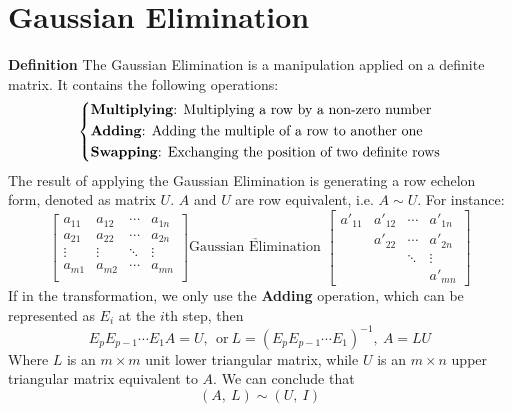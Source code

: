 \documentclass[11pt]{article}
\begin{document}
\section{Gaussian Elimination}
\noindent \textbf{Definition} The Gaussian Elimination is a manipulation applied on a definite matrix. It contains the following operations:
\begin{equation}
\left\{
\begin{aligned}
    &\text{\textbf{Multiplying}: Multiplying a row by a non-zero number} \\
    &\text{\textbf{Adding}: Adding the multiple of a row to another one} \\
    &\text{\textbf{Swapping}: Exchanging the position of two definite rows}\\
\end{aligned}
\right.
\end{equation}
The result of applying the Gaussian Elimination is generating a row echelon form, denoted as matrix $U$. $A$ and $U$ are row equivalent, i.e. $A \sim U$. For instance:
\begin{equation}
\begin{bmatrix}
    a_{11} & a_{12} & \cdots & a_{1n}\\
    a_{21} & a_{22} & \cdots & a_{2n}\\
    \vdots & \vdots & \ddots & \vdots\\
    a_{m1} & a_{m2} & \cdots & a_{mn}\\
\end{bmatrix}
\underrightarrow{\text{Gaussian Elimination }}
\begin{bmatrix}
    a'_{11} & a'_{12} & \cdots & a'_{1n}\\
     & a'_{22} & \cdots & a'_{2n} \\
     &  & \ddots & \vdots \\
     &  &  & a'_{mn}
\end{bmatrix}
\end{equation}
If in the transformation, we only use the \textbf{Adding} operation, which can be represented as $E_i$ at the $i$th step, then
\begin{equation}
    E_pE_{p-1}\cdots E_1A = U,~~\text{or}~L = (E_pE_{p-1}\cdots E_1)^{-1},~A = LU
\end{equation}
Where $L$ is an $m \times m$ unit lower triangular matrix, while $U$ is an $m \times n$ upper triangular matrix equivalent to $A$. We can conclude that
\begin{equation}
    (A,~L) \sim (U,~I)
\end{equation}
\end{document}
